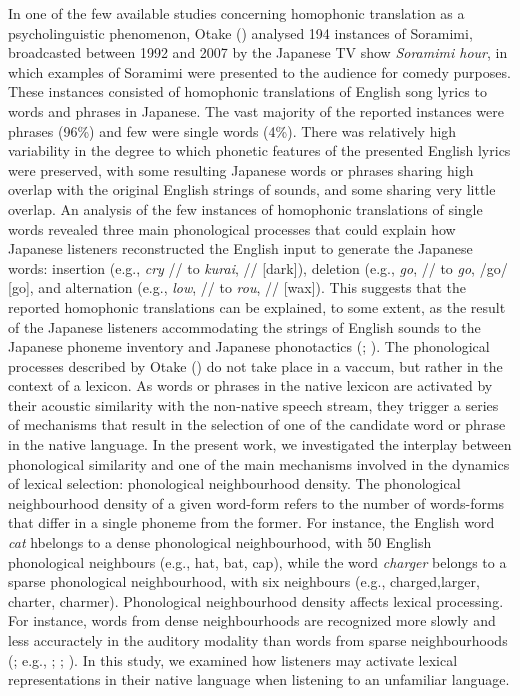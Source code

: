 \documentclass[
]{article}
\begin{document}
In one of the few available studies concerning homophonic translation as
a psycholinguistic phenomenon, Otake
() analysed 194 instances of
Soramimi, broadcasted between 1992 and 2007 by the Japanese TV show
\emph{Soramimi hour}, in which examples of Soramimi were presented to
the audience for comedy purposes. These instances consisted of
homophonic translations of English song lyrics to words and phrases in
Japanese. The vast majority of the reported instances were phrases
(96\%) and few were single words (4\%). There was relatively high
variability in the degree to which phonetic features of the presented
English lyrics were preserved, with some resulting Japanese words or
phrases sharing high overlap with the original English strings of
sounds, and some sharing very little overlap. An analysis of the few
instances of homophonic translations of single words revealed three main
phonological processes that could explain how Japanese listeners
reconstructed the English input to generate the Japanese words:
insertion (e.g., \emph{cry} // to \emph{kurai},
// {[}dark{]}), deletion (e.g., \emph{go},
// to \emph{go}, /go/ {[}go{]}, and alternation (e.g.,
\emph{low}, // to \emph{rou}, // {[}wax{]}).
This suggests that the reported homophonic translations can be
explained, to some extent, as the result of the Japanese listeners
accommodating the strings of English sounds to the Japanese phoneme
inventory and Japanese phonotactics
(;
). The
phonological processes described by Otake
() do not take place in a
vaccum, but rather in the context of a lexicon. As words or phrases in
the native lexicon are activated by their acoustic similarity with the
non-native speech stream, they trigger a series of mechanisms that
result in the selection of one of the candidate word or phrase in the
native language. In the present work, we investigated the interplay
between phonological similarity and one of the main mechanisms involved
in the dynamics of lexical selection: phonological neighbourhood
density. The phonological neighbourhood density of a given word-form
refers to the number of words-forms that differ in a single phoneme from
the former. For instance, the English word \emph{cat} hbelongs to a
dense phonological neighbourhood, with 50 English phonological
neighbours (e.g., hat, bat, cap), while the word \emph{charger} belongs
to a sparse phonological neighbourhood, with six neighbours (e.g.,
charged,larger, charter, charmer). Phonological neighbourhood density
affects lexical processing. For instance, words from dense
neighbourhoods are recognized more slowly and less accuractely in the
auditory modality than words from sparse neighbourhoods
(;
e.g., ;
;
). In this
study, we examined how listeners may activate lexical representations in
their native language when listening to an unfamiliar language.
\end{document}
